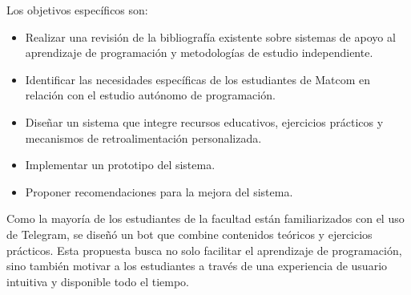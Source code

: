 \documentclass{article}
\begin{document}
Los objetivos específicos son:
\begin{itemize}
    \item Realizar una revisión de la bibliografía existente sobre sistemas de apoyo al aprendizaje de programación y metodologías de estudio independiente.
    \item Identificar las necesidades específicas de los estudiantes de Matcom en relación con el estudio autónomo de programación.
    \item Diseñar un sistema que integre recursos educativos, ejercicios prácticos y mecanismos de retroalimentación personalizada.
    \item Implementar un prototipo del sistema.
    \item Proponer recomendaciones para la mejora del sistema.
\end{itemize}

Como la mayoría de los estudiantes de la facultad están familiarizados con el uso de Telegram, se diseñó un bot que combine contenidos teóricos y ejercicios prácticos. Esta propuesta busca no solo facilitar el aprendizaje de programación, sino también motivar a los estudiantes a través de una experiencia de usuario intuitiva y disponible todo el tiempo.

\begin{thebibliography}{99}
  
\end{thebibliography}
\end{document}
